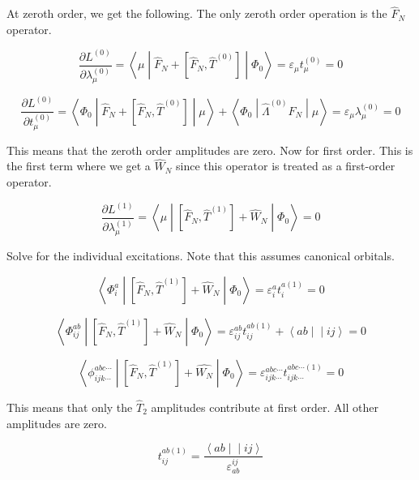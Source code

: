\documentclass{article}
\newcommand{\tei}[2]{\left<{#1}\middle|\middle|{#2}\right>}
\begin{document}
At zeroth order, we get the following. The only zeroth order operation is the $\hat{F}_N$ operator.

\begin{equation}
  \frac{\partial L^{(0)}}{\partial \lambda_\mu^{(0)}} = \left<\mu\middle|\hat{F}_N + \left[\hat{F}_N, \hat{T}^{(0)}\right]\middle|\Phi_0\right> = \varepsilon_\mu t_\mu^{(0)} = 0
\end{equation}

\begin{equation}
  \frac{\partial L^{(0)}}{\partial t_\mu^{(0)}} = \left<\Phi_0\middle|\hat{F}_N + \left[\hat{F}_N, \hat{T}^{(0)}\right]\middle|\mu\right> + \left<\Phi_0\middle|\hat{\Lambda}^{(0)}\hat{F}_N\middle|\mu\right> = \varepsilon_\mu\lambda_\mu^{(0)} = 0
\end{equation}

This means that the zeroth order amplitudes are zero. Now for first order. This is the first term where we get a $\hat{W}_N$ since this operator is treated as a first-order operator.

\begin{equation}
  \frac{\partial L^{(1)}}{\partial \lambda_\mu^{(1)}} = \left<\mu\middle|\left[\hat{F}_N, \hat{T}^{(1)}\right] + \hat{W}_N\middle|\Phi_0\right> = 0
\end{equation}

Solve for the individual excitations. Note that this assumes canonical orbitals.

\begin{equation}
  \left<\Phi_i^a\middle|\left[\hat{F}_N, \hat{T}^{(1)}\right] + \hat{W}_N\middle|\Phi_0\right> = \varepsilon_i^at_i^{a(1)} = 0
\end{equation}

\begin{equation}
  \left<\Phi_{ij}^{ab}\middle|\left[\hat{F}_N, \hat{T}^{(1)}\right] + \hat{W}_N\middle|\Phi_0\right> = \varepsilon_{ij}^{ab}t_{ij}^{ab(1)} + \tei{ab}{ij} = 0
\end{equation}

\begin{equation}
  \left<\phi_{ijk\cdots}^{abc\cdots}\middle|\left[\hat{F}_N, \hat{T}^{(1)}\right] + \hat{W_N}\middle|\Phi_0\right> = \varepsilon_{ijk\cdots}^{abc\cdots}t_{ijk\cdots}^{abc\cdots(1)} = 0
\end{equation}

This means that only the $\hat{T}_2$ amplitudes contribute at first order. All other amplitudes are zero.

\begin{equation}
  t_{ij}^{ab(1)} = \frac{\tei{ab}{ij}}{\varepsilon_{ab}^{ij}}
\end{equation}
\end{document}
